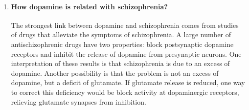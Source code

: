 \documentclass[12pt,article,oneside,a4paper]{memoir}
\begin{document}
\begin{enumerate}
\item \paragraph{How dopamine is related with schizophrenia?}
The strongest link between dopamine and schizophrenia comes from studies of
drugs that alleviate the symptoms of schizophrenia. A large number of
antischizophrenic drugs have two properties: block postsynaptic dopamine
receptors and inhibit the release of dopamine from presynaptic neurons.
One interpretation of these results is that schizophrenia is due to an excess
of dopamine. Another possibility is that the problem is not an excess of
dopamine, but a deficit of glutamate. If glutamate release is reduced, one way
to correct this deficiency would be block activity at dopaminergic receptors,
relieving glutamate synapses from inhibition.

\end{enumerate}

\end{document}
